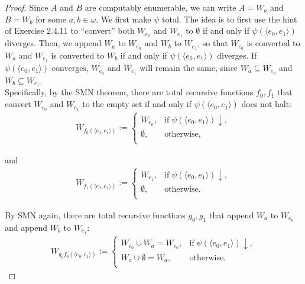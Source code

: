 \documentclass{article}
\begin{document}
\begin{enumerate}[label={\bf Q\arabic*:}]
\begin{enumerate}[label={(\roman*)}]
\begin{proof}
          Since $A$ and $B$ are computably enumerable, we can write $A=W_a$
          and $B=W_b$ for some $a,b\in\omega$. We first make $\psi$ total.
          The idea is to first use the hint of Exercise 2.4.11 to
          ``convert'' both $W_{e_0}$ and $W_{e_1}$ to $\emptyset$ if and
          only if $\psi(\langle e_0,e_1\rangle)$ diverges. Then, we append
          $W_a$ to $W_{e_0}$ and $W_b$ to $W_{e_1}$, so that $W_{e_0}$ is
          converted to $W_a$ and $W_{e_1}$ is converted to $W_b$ if and
          only if $\psi(\langle e_0,e_1\rangle)$ diverges. If $\psi(\langle
          e_0,e_1\rangle)$ converges, $W_{e_0}$ and $W_{e_1}$ will remain
          the same, since $W_a\subseteq W_{e_0}$ and $W_b\subseteq
          W_{e_1}$. \\

          Specifically, by the SMN theorem, there are total recursive
          functions $f_0,f_1$ that convert $W_{e_0}$ and $W_{e_1}$ to the
          empty set if and only if $\psi(\langle e_0,e_1\rangle)$ does not
          halt:
          \begin{align*}
            W_{f_0(\langle e_0,e_1\rangle)} :=
            \begin{cases}
              W_{e_0}, &\text{if}\; \psi(\langle e_0,e_1\rangle)\downarrow,\\
              \emptyset, &\text{otherwise},\\
            \end{cases}
          \end{align*}

          and
          \begin{align*}
            W_{f_1(\langle e_0,e_1\rangle)} :=
            \begin{cases}
              W_{e_1}, &\text{if}\; \psi(\langle e_0,e_1\rangle)\downarrow,\\
              \emptyset, &\text{otherwise}.\\
            \end{cases}
          \end{align*}

          By SMN again, there are total recursive functions $g_0,g_1$ that
          append $W_a$ to $W_{e_0}$ and append $W_b$ to $W_{e_1}$:
          \begin{align*}
            W_{g_0f_0(\langle e_0,e_1\rangle)} :=
            \begin{cases}
              W_{e_0}\cup W_a=W_{e_0}, &\text{if}\; \psi(\langle
                e_0,e_1\rangle)\downarrow,\\
              W_a\cup\emptyset =W_a, &\text{otherwise},\\
            \end{cases}
          \end{align*}


\end{proof}
\end{enumerate}
\end{enumerate}
\end{document}

